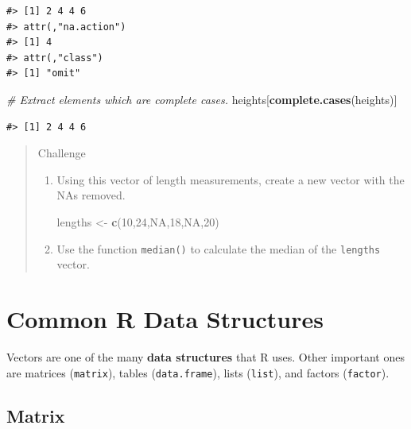 \documentclass[]{book}
\newenvironment{Shaded}{\begin{snugshade}}{\end{snugshade}}
\newcommand{\KeywordTok}[1]{\textcolor[rgb]{0.13,0.29,0.53}{\textbf{#1}}}
\newcommand{\DecValTok}[1]{\textcolor[rgb]{0.00,0.00,0.81}{#1}}
\newcommand{\StringTok}[1]{\textcolor[rgb]{0.31,0.60,0.02}{#1}}
\newcommand{\CommentTok}[1]{\textcolor[rgb]{0.56,0.35,0.01}{\textit{#1}}}
\newcommand{\OtherTok}[1]{\textcolor[rgb]{0.56,0.35,0.01}{#1}}
\newcommand{\NormalTok}[1]{#1}
\theoremstyle{definition}
\theoremstyle{definition}
\theoremstyle{definition}
\theoremstyle{remark}
\begin{document}
\begin{verbatim}
#> [1] 2 4 4 6
#> attr(,"na.action")
#> [1] 4
#> attr(,"class")
#> [1] "omit"
\end{verbatim}

\begin{Shaded}
\begin{Highlighting}[]
\CommentTok{# Extract elements which are complete cases.}
\NormalTok{heights[}\KeywordTok{complete.cases}\NormalTok{(heights)]}
\end{Highlighting}
\end{Shaded}

\begin{verbatim}
#> [1] 2 4 4 6
\end{verbatim}

\begin{quote}
Challenge

\begin{enumerate}
\def\labelenumi{\arabic{enumi}.}
\item
  Using this vector of length measurements, create a new vector with the
  NAs removed.

\begin{Shaded}
\begin{Highlighting}[]
\NormalTok{lengths <-}\StringTok{ }\KeywordTok{c}\NormalTok{(}\DecValTok{10}\NormalTok{,}\DecValTok{24}\NormalTok{,}\OtherTok{NA}\NormalTok{,}\DecValTok{18}\NormalTok{,}\OtherTok{NA}\NormalTok{,}\DecValTok{20}\NormalTok{)}
\end{Highlighting}
\end{Shaded}
\item
  Use the function \texttt{median()} to calculate the median of the
  \texttt{lengths} vector.
\end{enumerate}
\end{quote}

\section{Common R Data Structures}\label{common-r-data-structures}

Vectors are one of the many \textbf{data structures} that R uses. Other
important ones are matrices (\texttt{matrix}), tables
(\texttt{data.frame}), lists (\texttt{list}), and factors
(\texttt{factor}).

\subsection{Matrix}\label{matrix}
\end{document}
